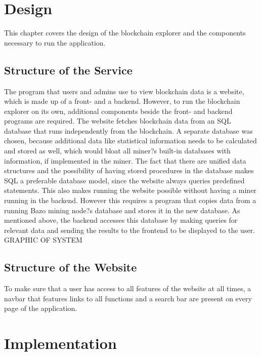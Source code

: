 \chapter{Design}
This chapter covers the design of the blockchain explorer and the components necessary to run the application.

\section{Structure of the Service}
The program that users and admins use to view blockchain data is a website, which is made up of a front- and a backend. However, to run the blockchain explorer on its own, additional components beside the front- and backend programs are required. The website fetches blockchain data from an SQL database that runs independently from the blockchain. A separate database was chosen, because additional data like statistical information needs to be calculated and stored as well, which would bloat all miner?s built-in databases with information, if implemented in the miner. The fact that there are unified data structures and the possibility of having stored procedures in the database makes SQL a preferable database model, since the website always queries predefined statements. This also makes running the website possible without having a miner running in the backend. However this requires a program that copies data from a running Bazo mining node?s database and stores it in the new database. As mentioned above, the backend accesses this database by making queries for relevant data and sending the results to the frontend to be displayed to the user.
GRAPHIC OF SYSTEM
\section{Structure of the Website}
To make sure that a user has access to all features of the website at all times, a navbar that features links to all functions and a search bar are present on every page of the application. 

\chapter{Implementation}

\section{}